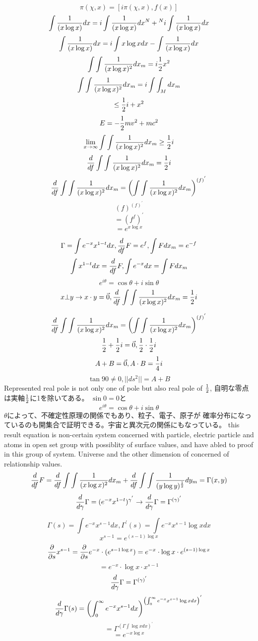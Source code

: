 \documentclass{jsarticle}
\begin{document}
  $$ \pi(\chi,x) = [i\pi(\chi,x),f(x)] $$
  $$ \int{1 \over (x \log x)}dx = i \int{1 \over (x \log x)}dx^{N}  
  + {}^{N} i \int{1 \over (x \log x)}dx $$
  $$  \int{1 \over (x \log x)}dx = i \int{x \log x}dx 
  - \int{1 \over (x \log x)}dx $$
  $$ \int \int{1 \over (x \log x)^2}dx_m = i {1 \over 2}x^2 $$
  $$ \int \int{1 \over (x \log x)^2}dx_m = i \int \int_M dx_m $$
  $$ \le {1 \over 2}i + x^2 $$
  $$ E = - {1 \over 2}mv^2 + mc^2 $$
  $$ \lim_{x \to \infty} \int \int{1 \over (x \log x)^2}dx_m \ge {1 \over 2}i $$
  $$ {d \over df}\int \int{1 \over (x \log x)^2}dx_m = {1 \over 2}i $$
  $$ {d \over df}\int \int{1 \over (x \log x)^2}dx_m = 
  \left(\int \int {1 \over (x \log x)^2}dx_m \right)^{(f)^{'}}$$
  $$ (f)^{(f)^{'}} $$
  $$ = (f^f)^{'} $$
  $$ = e^{x \log x} $$

  $$ \Gamma = \int {e^{-x}x^{1-t}}dx, 
  {d \over df}F = e^f, \int F dx_m = e^{-f} $$
  $$ \int x^{1-t}dx = {d \over df}F, \int e^{-x}dx = \int F dx_m $$
  $$ e^{i \theta} = \cos \theta + i \sin \theta $$
  $$ x \bot y \to x \cdot y = \vec{0}, 
  {d \over df}\int \int{1 \over (x \log x)^2}dx_m = {1 \over 2}i $$

  $$ {d \over df}\int \int{1 \over (x \log x)^2}dx_m = 
  \left(\int \int {1 \over (x \log x)^2}dx_m \right)^{(f)^{'}}$$
  $$ {1 \over 2} + {1 \over 2}i = \vec{0}, {1 \over 2}\cdot{1 \over 2}i $$
  $$ A + B  =  \vec{0}, A \cdot B = {1 \over 4}i $$
  $$  \tan 90 \neq 0, ||ds^2|| = A + B $$
  Represented real pole is not only one of pole but also real pole of 
  $ {1 \over 2} $, 
  自明な零点は実軸${1 \over 2}  $に1を除いてある。
  $\sin 0 = 0$と$$ e^{i \theta} = \cos \theta + i \sin \theta $$
  $\theta $によって、不確定性原理の関係でもあり、粒子、電子、原子が
  確率分布になっているのも開集合で証明できる。宇宙と異次元の関係にもなっている。
  this result equation is non-certain system concerned with particle, electric 
  particle and atoms in open set group with possiblity of surface values,
  and have abled to proof in this group of system. Universe and the other
  dimension of concerned of relationship values.
  $$ {d \over df}F = {d \over df} \int \int{1 \over (x \log x)^2}dx_m 
  + {d \over df} \int \int {1 \over (y \log y)^{1 \over 2}}dy_m
  = \Gamma(x,y) $$
  $$ {d \over d \gamma}\Gamma = (e^{-x}x^{1-t})^{\gamma^{'}} \to
  {d \over d \gamma}\Gamma = \Gamma^{(\gamma)^{'}}$$



    $$ \Gamma(s) = \int e^{-x} x^{s - 1}dx, \Gamma^{'}(s)
    = \int e^{-x} x^{s - 1}\log x dx $$
    $$ x^{s - 1} = e^{(s - 1)\log x} $$
    $$ {\partial \over \partial s}x^{s - 1} =
       {\partial \over \partial s}e^{-x}\cdot (e^{{s - 1}\log x}) 
       = e^{-x}\cdot \log x \cdot e^{(s - 1) \log x} $$
    $$ = e^{-x}\cdot \log x \cdot x^{s - 1} $$
    $$ {d \over d \gamma}\Gamma = \Gamma^{(\gamma)^{'}} $$
    $$ {d \over d \gamma}\Gamma(s) = \left( \int^{\infty}_{0}e^{-x}
    x^{s - 1}dx \right)^{\left(\int^{\infty}_{0}e^{-x}x^{s - 1}\log x dx
    \right)^{'}} $$
    $$ = \Gamma^{(\Gamma \int \log x dx)^{'}} $$
    $$ = e^{-x \log x} $$
\end{document}
